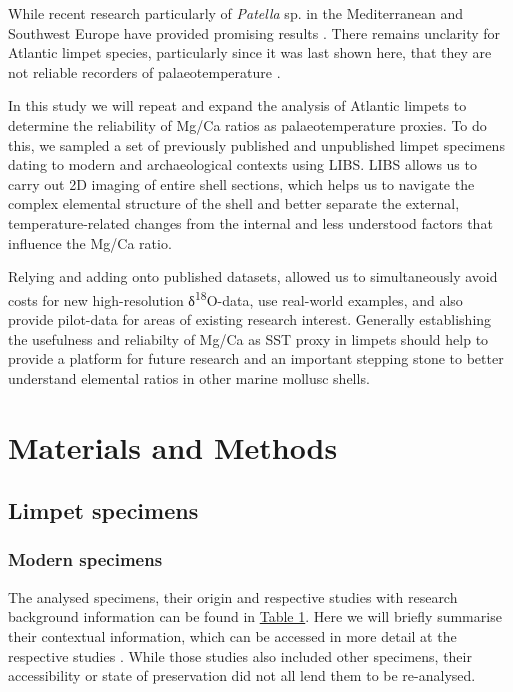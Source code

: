 \documentclass[
  authoryear,
  preprint,
  3p]{elsarticle}
\begin{document}
While recent research particularly of \emph{Patella} sp. in the
Mediterranean and Southwest Europe have provided promising results
\citep{Hausmann2019-fi, Garcia-Escarzaga2015-jc, Garcia-Escarzaga2018-nf}.
There remains unclarity for Atlantic limpet species, particularly since
it was last shown here, that they are not reliable recorders of
palaeotemperature \citep{Graniero2015-zv}.

In this study we will repeat and expand the analysis of Atlantic limpets
to determine the reliability of Mg/Ca ratios as palaeotemperature
proxies. To do this, we sampled a set of previously published and
unpublished limpet specimens dating to modern and archaeological
contexts using LIBS. LIBS allows us to carry out 2D imaging of entire
shell sections, which helps us to navigate the complex elemental
structure of the shell and better separate the external,
temperature-related changes from the internal and less understood
factors that influence the Mg/Ca ratio.

Relying and adding onto published datasets, allowed us to simultaneously
avoid costs for new high-resolution δ\textsuperscript{18}O-data, use
real-world examples, and also provide pilot-data for areas of existing
research interest. Generally establishing the usefulness and reliabilty
of Mg/Ca as SST proxy in limpets should help to provide a platform for
future research and an important stepping stone to better understand
elemental ratios in other marine mollusc shells.

\section{Materials and Methods}\label{Methods}

\subsection{Limpet specimens}\label{limpet-specimens}

\subsubsection{Modern specimens}\label{modern-specimens}

The analysed specimens, their origin and respective studies with
research background information can be found in \hyperref[Table_1]{Table
1}. Here we will briefly summarise their contextual information, which
can be accessed in more detail at the respective studies
\citep{Nicastro2020-ih, Surge2012-ba, Graniero2017-io}. While those
studies also included other specimens, their accessibility or state of
preservation did not all lend them to be re-analysed.
\end{document}
